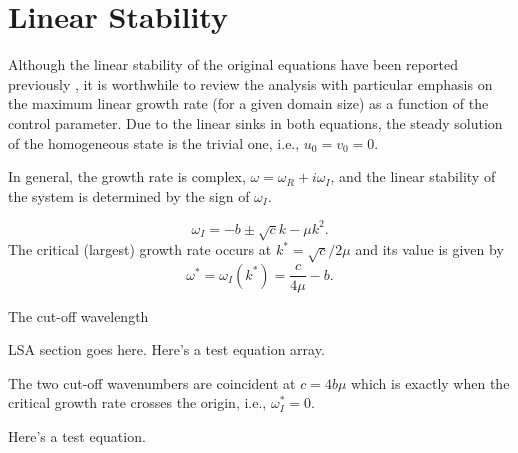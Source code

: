 \documentclass{ws-ijbc}
\newcommand\beq{\begin{equation}}
\newcommand\eeq{\end{equation}}
\newcommand\beqa{\begin{equation}\begin{aligned}}
\newcommand\eeqa{\end{aligned}\end{equation}}
\begin{document}
\section{Linear Stability}
\label{sec.lsa}

Although the linear stability of the original equations have been reported previously \cite{kreiss02, fullmer14b}, it is worthwhile to review the analysis with particular emphasis on the maximum linear growth rate (for a given domain size) as a function of the control parameter. Due to the linear sinks in both equations, the steady solution of the homogeneous state is the trivial one, i.e., $u_0 = v_0 = 0$. 




In general, the growth rate is complex, $\omega = \omega_R + i \omega_I$, and the linear stability of the system is determined by the sign of $\omega_I$. 

\beq
\omega_I = -b \pm \sqrt{c} k -\mu k^2 .
\label{eq.omega}
\eeq
The critical (largest) growth rate occurs at $k^* = \sqrt{c} / 2 \mu$ and its value is given by
\beq
\omega^* = \omega_I (k^*) = \frac{{c}}{{4 \mu}} - b .
\label{eq.omega}
\eeq



The cut-off wavelength



LSA section goes here. Here's a test equation array. 






The two cut-off wavenumbers are coincident at $c = 4 b \mu$ which is exactly when the critical growth rate crosses the origin, i.e., $\omega_I^* = 0$. 



Here's a test equation. 

\end{document}
